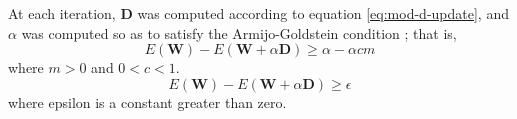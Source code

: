%
%

%




%

At each iteration, $\textbf{D}$ was computed according to equation \eqref{eq:mod-d-update}, 
and $\alpha$ was computed so as to satisfy the
Armijo-Goldstein condition \citep{armijo:1966}; that is, 
\begin{equation}
E(\mathbf {W} )-E(\mathbf {W} +\alpha \mathbf {D} )\geq \alpha -\alpha c m
\end{equation}
where $m > 0$ and $0 < c < 1$.
\begin{equation}
E(\mathbf {W})-E(\mathbf {W} +\alpha \mathbf {D} )\geq \epsilon
\end{equation}
where epsilon is a constant greater than zero.

